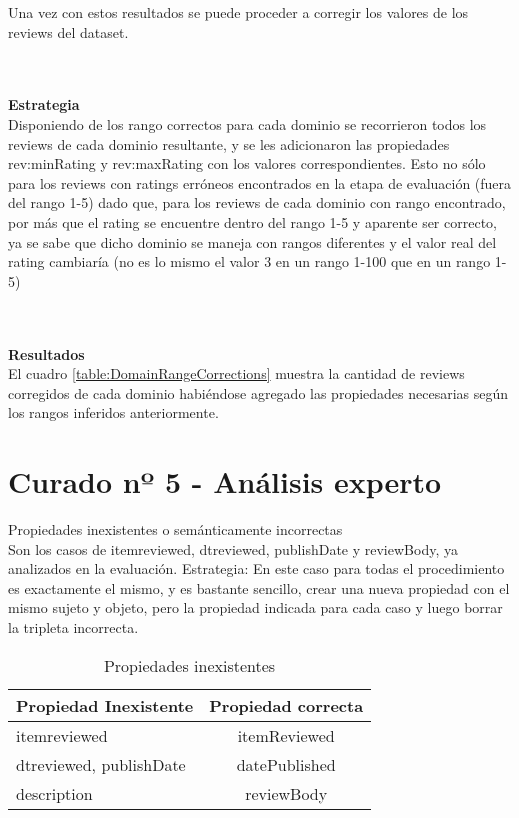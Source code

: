 Una vez con estos resultados se puede proceder a corregir los valores de los reviews del dataset.

~\\\\\textbf{Estrategia}\\
Disponiendo de los rango correctos para cada dominio se recorrieron todos los reviews de cada dominio resultante, y se les adicionaron 
las propiedades rev:minRating y rev:maxRating con los valores correspondientes.
Esto no sólo para los reviews con ratings erróneos encontrados en la etapa de evaluación (fuera del rango 1-5) dado que, para los reviews de 
cada dominio con rango encontrado, por más que el rating se encuentre dentro del rango 1-5 y aparente ser correcto,  ya se sabe que dicho dominio se 
maneja con rangos diferentes y el valor real del rating cambiaría (no es lo mismo el valor 3 en un rango 1-100 que en un rango 1-5)

~\\\\\textbf{Resultados}\\
El cuadro \ref{table:DomainRangeCorrections} muestra la cantidad de reviews corregidos de cada dominio habiéndose agregado las 
propiedades necesarias según los rangos inferidos anteriormente.

\section{Curado nº 5 - Análisis experto}
\label{section:curado-analisis}
Propiedades inexistentes o semánticamente incorrectas\\
Son los casos de itemreviewed, dtreviewed, publishDate y reviewBody, ya analizados en la evaluación.
Estrategia: En este caso para todas el procedimiento es exactamente el mismo, y es bastante sencillo, crear una nueva propiedad con 
el mismo sujeto y objeto, pero la propiedad indicada para cada caso y luego borrar la tripleta incorrecta.\\

\begin{table}[h]
\begin{tabular}{| l | c |}\hline
 Propiedad Inexistente & Propiedad correcta \\\hline
 itemreviewed & itemReviewed\\
 dtreviewed, publishDate & datePublished\\
 description & reviewBody\\\hline
\end{tabular}
\caption{Propiedades inexistentes}
\label{table:UndefinedProps}
\end{table}

